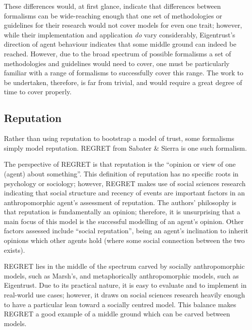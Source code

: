 These differences would, at first glance, indicate that differences between formalisms can be wide-reaching enough that one set of methodologies or guidelines for their research would not cover models for even one trait; however, while their implementation and application \emph{do} vary considerably, Eigentrust's direction of agent behaviour indicates that some middle ground can indeed be reached. However, due to the broad spectrum of possible formalisms a set of methodologies and guidelines would need to cover, one must be particularly familiar with a range of formalisms to successfully cover this range. The work to be undertaken, therefore, is far from trivial, and would require a great degree of time to cover properly.\par

\subsection{Reputation}
Rather than using reputation to bootstrap a model of trust, some formalisms simply model reputation. REGRET\cite{Sabater} from Sabater \& Sierra is one such formalism.\par

The perspective of REGRET is that reputation is the ``opinion or view of one (agent) about something''\cite{Sabater}. This definition of reputation has no specific roots in psychology or sociology; however, REGRET makes use of social sciences research indicating that social structure and recency of events are important factors in an anthropomorphic agent's assessment of reputation. The authors' philosophy is that reputation is fundamentally an opinion; therefore, it is unsurprising that a main focus of this model is the successful modelling of an agent's opinion. Other factors assessed include ``social reputation'', being an agent's inclination to inherit opinions which other agents hold (where some social connection between the two exists).\par

REGRET lies in the middle of the spectrum carved by socially anthropomorphic models, such as Marsh's, and metaphorically anthropomorphic models, such as Eigentrust. Due to its practical nature, it is easy to evaluate and to implement in real-world use cases; however, it draws on social sciences research heavily enough to have a particular lean toward a socially centred model. This balance makes REGRET a good example of a middle ground which can be carved between models.\par

